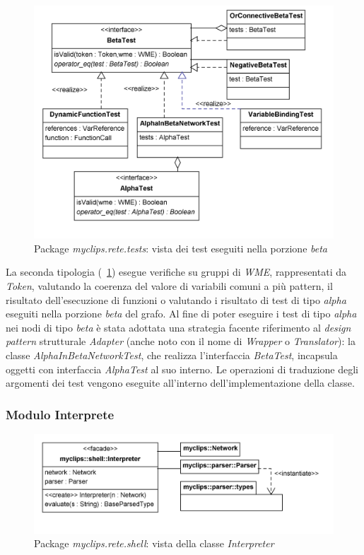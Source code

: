 \begin{figure}[h]
\centering
\includegraphics[width=1\textwidth]{Immagini/Capitolo3/Classi/myclips_rete_tests_Beta.png}
\caption{Package \emph{myclips.rete.tests}: vista dei test eseguiti nella porzione \emph{beta}}\label{fig:class-myclips-rete-tests-beta}
\end{figure}

La seconda tipologia (\figurename~\ref{fig:class-myclips-rete-tests-beta}) esegue verifiche su gruppi di \emph{WME}, rappresentati da \emph{Token}, valutando la coerenza del valore di variabili comuni a più pattern, il risultato dell'esecuzione di funzioni o valutando i risultato di test di tipo \emph{alpha} eseguiti nella porzione \emph{beta} del grafo. Al fine di poter eseguire i test di tipo \emph{alpha} nei nodi di tipo \emph{beta} è stata adottata una strategia facente riferimento al \emph{design pattern} strutturale \emph{Adapter} (anche noto con il nome di \emph{Wrapper} o \emph{Translator}): la classe \emph{AlphaInBetaNetworkTest}, che realizza l'interfaccia \emph{BetaTest}, incapsula oggetti con interfaccia \emph{AlphaTest} al suo interno. Le operazioni di traduzione degli argomenti dei test vengono eseguite all'interno dell'implementazione della classe.

\subsubsection{Modulo Interprete}

\begin{figure}[h]
\centering
\includegraphics[width=1\textwidth]{Immagini/Capitolo3/Classi/myclips_shell_Interpreter.png}
\caption{Package \emph{myclips.rete.shell}: vista della classe \emph{Interpreter}}\label{fig:class-myclips-shell-interpreter}
\end{figure}


